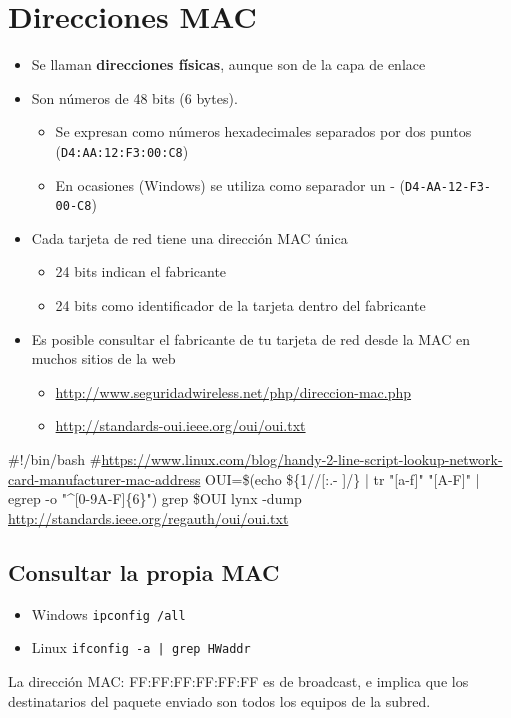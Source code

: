 \documentclass{article}
\begin{document}
\section{Direcciones MAC}
\label{sec:org508253b}
\begin{itemize}
\item Se llaman \textbf{direcciones físicas}, aunque son de la capa de enlace
\item Son números de 48 bits (6 bytes). 
\begin{itemize}
\item Se expresan como números hexadecimales separados por dos puntos (\texttt{D4:AA:12:F3:00:C8})
\item En ocasiones (Windows) se utiliza como separador un - (\texttt{D4-AA-12-F3-00-C8})
\end{itemize}
\item Cada tarjeta de red tiene una dirección MAC única
\begin{itemize}
\item 24 bits indican el fabricante
\item 24 bits como identificador de la tarjeta dentro del fabricante
\end{itemize}

\item Es posible consultar el fabricante de tu tarjeta de red desde la MAC en muchos sitios de la web
\begin{itemize}
\item \href{http://www.seguridadwireless.net/php/direccion-mac.php}{http://www.seguridadwireless.net/php/direccion-mac.php}
\item \href{http://standards-oui.ieee.org/oui/oui.txt}{http://standards-oui.ieee.org/oui/oui.txt}
\end{itemize}
\end{itemize}

\begin{NOTES}


\#!/bin/bash
\#\url{https://www.linux.com/blog/handy-2-line-script-lookup-network-card-manufacturer-mac-address}
OUI=\$(echo \$\{1//[:.- ]/\} | tr "[a-f]" "[A-F]" | egrep -o "\^{}[0-9A-F]\{6\}")
grep \$OUI lynx -dump \url{http://standards.ieee.org/regauth/oui/oui.txt}
\end{NOTES}

\subsection{Consultar la propia MAC}
\label{sec:orgad6b110}
\begin{itemize}
\item Windows
\texttt{ipconfig /all}
\item Linux
\texttt{ifconfig -a | grep HWaddr}
\end{itemize}
La dirección MAC: FF:FF:FF:FF:FF:FF es de broadcast, e implica que los destinatarios del paquete enviado son todos los equipos de la subred.
\end{document}
